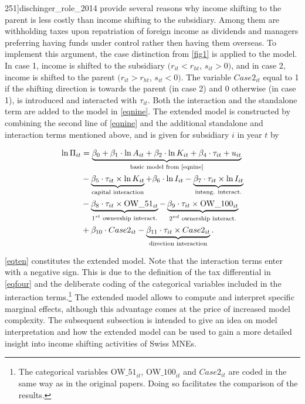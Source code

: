 \documentclass[10pt,twocolumn,oneside,cmyk]{article}
\begin{document}
251]{dischinger_role_2014} provide several reasons why income shifting to the parent is less costly than income shifting to the subsidiary. Among them are withholding taxes upon repatriation of foreign income as dividends and managers preferring having funds under control rather then having them overseas. To implement this argument, the case distinction from \cref{fig1} is applied to the model. In case 1, income is shifted to the subsidiary $(r_{it} < r_{ht}$, $s_{it} > 0)$, and in case 2, income is shifted to the parent $(r_{it} > r_{ht}$, $s_{it} < 0)$. The variable $Case2_{it}$ equal to 1 if the shifting direction is towards the parent (in case 2) and 0 otherwise (in case 1), is introduced and interacted with $\tau_{it}$. Both the interaction and the standalone term are added to the model in \cref{eqnine}. The extended model is constructed by combining the second line of \cref{eqnine} and the additional standalone and interaction terms mentioned above, and is given for subsidiary $i$ in year $t$ by

\begin{equation}\label{eqten}
 \begin{split}
  \ln \Pi_{it} & = \underbrace{\beta_0 + \beta_1 \cdot \ln A_{it} + \beta_2 \cdot \ln K_{it} + \beta_4 \cdot \tau_{it} + u_{it}}_{\text{basic model from \cref{eqnine}}}\\
	& - \underbrace{\beta_5 \cdot \tau_{it} \times \ln K_{it}}_{\text{capital interaction}} + \beta_6 \cdot \ln I_{it} -\underbrace{\beta_7 \cdot \tau_{it} \times \ln I_{it}}_{\text{intang. interact.}}\\
	& - \underbrace{\beta_8 \cdot \tau_{it} \times \text{OW\_51}_{it}}_{\text{$1^{st}$ ownership interact.}} - \underbrace{\beta_9 \cdot \tau_{it} \times \text{OW\_100}_{it}}_{\text{$2^{nd}$ ownership interact.}}\\
	& + \beta_{10} \cdot Case2_{it} - \underbrace{\beta_{11} \cdot \tau_{it} \times Case2_{it}}_{\text{direction interaction}}.
 \end{split}
\end{equation}

\cref{eqten} constitutes the extended model. Note that the interaction terms enter with a negative sign. This is due to the definition of the tax differential in \cref{eqfour} and the deliberate coding of the categorical variables included in the interaction terms.\footnote{The categorical variables $\text{OW\_51}_{it}$, $\text{OW\_100}_{it}$ and $Case2_{it}$ are coded in the same way as in the original papers. Doing so facilitates the comparison of the results.} The extended model allows to compute and interpret specific marginal effects, although this advantage comes at the price of increased model complexity. The subsequent subsection is intended to give an idea on model interpretation and how the extended model can be used to gain a more detailed insight into income shifting activities of Swiss MNEs.
\end{document}
